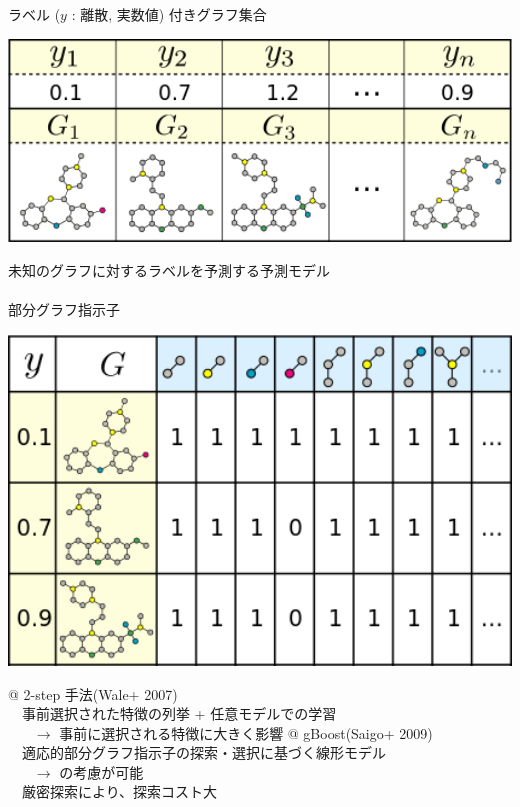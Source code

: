 \begin{tcolorbox}[title={\large グラフに対する教師付き学習}]
	ラベル ($y$ : 離散, 実数値) 付きグラフ集合 \\
	\vspace{5pt}
	\begin{center}
		\includegraphics[width=470pt]{img/graph_classify.png}
	\end{center}
	未知のグラフに対するラベルを予測する予測モデル \\
	\vspace{5pt}\\
	部分グラフ指示子 \\
	\vspace{5pt}
	\begin{center}
		\includegraphics[width=470pt]{img/graph_indicator.png}
	\end{center}
	\vspace{-15pt}
	\begin{easylist}[itemize]
	@ 2-step 手法(Wale+ 2007) \\
	$~~~$ \alert{事前選択された特徴}の列挙 + 任意モデルでの学習 \\
	$~~~~~~~~ \rightarrow$ 事前に選択される特徴に大きく影響
	\vspace{10pt}
	@ gBoost(Saigo+ 2009) \\
	$~~~$ 適応的部分グラフ指示子の探索・選択に基づく\alert{線形}モデル \\
	$~~~~~~~~ \rightarrow$ の考慮が可能 \\
	$~~~$ 厳密探索により、\alert{探索コスト大} 
	\end{easylist}
\end{tcolorbox}

